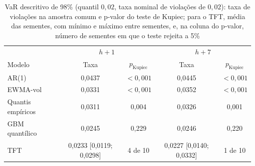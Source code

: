 \begin{table}[htb]
\centering
\caption[VaR descritivo de 98\%]{VaR descritivo de 98\% (quantil \(0{,}02\), taxa nominal de violações de \(0{,}02\)): taxa de violações na amostra comum e p-valor do teste de Kupiec; para o TFT, média das sementes, com mínimo e máximo entre sementes, e, na coluna do p-valor, número de sementes em que o teste rejeita a 5\%}
\label{tab:var}
\small
\begin{tabular}{l c c c c}
\toprule
 & \multicolumn{2}{c}{\(h+1\)} & \multicolumn{2}{c}{\(h+7\)} \\
Modelo & Taxa & \(p_{\text{Kupiec}}\) & Taxa & \(p_{\text{Kupiec}}\) \\
\midrule
AR(1) & 0,0437 & \(<0{,}001\) & 0,0445 & \(<0{,}001\) \\
EWMA-vol & 0,0331 & \(<0{,}001\) & 0,0352 & \(<0{,}001\) \\
Quantis empíricos & 0,0311 & 0,004 & 0,0326 & 0,001 \\
GBM quantílico & 0,0245 & 0,229 & 0,0246 & 0,220 \\
TFT & 0,0233 [0,0119; 0,0298] & 4 de 10 & 0,0227 [0,0140; 0,0332] & 1 de 10 \\
\bottomrule
\end{tabular}
\end{table}


